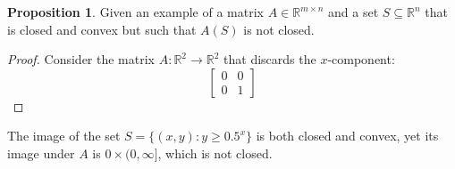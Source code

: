 \documentclass[12pt]{article}
\newcommand{\RR}{\mathbb{R}}
\theoremstyle{definition}
\newtheorem{prop}{Proposition}[section]
\begin{document}
	\begin{prop}
		Given an example of a matrix $A \in \RR^{m \times n}$ and a set $S \subseteq \RR^n$ that is closed and convex but such that $A(S)$ is not closed.
	\end{prop}
	
	\begin{proof}
		Consider the matrix $A: \RR^2 \to \RR^2$ that discards the $x$-component:
		\begin{equation*}
		\begin{bmatrix}
			0&0\\0&1	
		\end{bmatrix}
		\end{equation*}
	\end{proof}
	
	The image of the set $S = \{(x, y):y \geq 0.5^x\}$ is both closed and convex, yet its image under $A$ is $0 \times (0, \infty]$, which is not closed.
	
\end{document}
